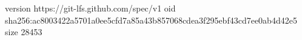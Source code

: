 version https://git-lfs.github.com/spec/v1
oid sha256:ac8003422a5701a0ee5cfd7a85a43b857068cdea3f295ebf43cd7ee0ab4d42e5
size 28453
